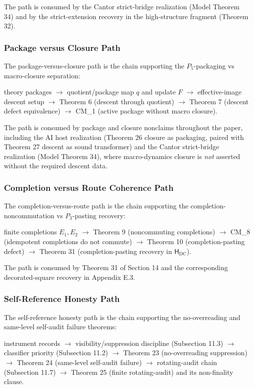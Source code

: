 \documentclass[11pt]{article}
\theoremstyle{definition}
\begin{document}
The path is consumed by the Cantor strict-bridge realization (Model Theorem 34) and by the strict-extension recovery in the high-structure fragment (Theorem 32).

\subsubsection{Package versus Closure Path}

The package-versus-closure path is the chain supporting the \(P_{5}\)-packaging vs macro-closure separation:

theory packages \(\to\) quotient/package map \(q\) and update \(F\) \(\to\) effective-image descent setup \(\to\) Theorem 6 (descent through quotient) \(\to\) Theorem 7 (descent defect equivalence) \(\to\) CM\_1 (active package without macro closure).

The path is consumed by package and closure nonclaims throughout the paper, including the AI host realization (Theorem 26 closure as packaging, paired with Theorem 27 descent as sound transformer) and the Cantor strict-bridge realization (Model Theorem 34), where macro-dynamics closure is \emph{not} asserted without the required descent data.

\subsubsection{Completion versus Route Coherence Path}

The completion-versus-route path is the chain supporting the completion-noncommutation vs \(P_{3}\)-pasting recovery:

finite completions \(E_{1},E_{2}\) \(\to\) Theorem 9 (noncommuting completions) \(\to\) CM\_8 (idempotent completions do not commute) \(\to\) Theorem 10 (completion-pasting defect) \(\to\) Theorem 31 (completion-pasting recovery in \(\mathsf H_{\mathrm{DC}}\)).

The path is consumed by Theorem 31 of Section 14 and the corresponding decorated-square recovery in Appendix E.3.

\subsubsection{Self-Reference Honesty Path}

The self-reference honesty path is the chain supporting the no-overreading and same-level self-audit failure theorems:

instrument records \(\to\) visibility/suppression discipline (Subsection 11.3) \(\to\) classifier priority (Subsection 11.2) \(\to\) Theorem 23 (no-overreading suppression) \(\to\) Theorem 24 (same-level self-audit failure) \(\to\) rotating-audit chain (Subsection 11.7) \(\to\) Theorem 25 (finite rotating-audit) and its non-finality clause.
\end{document}
